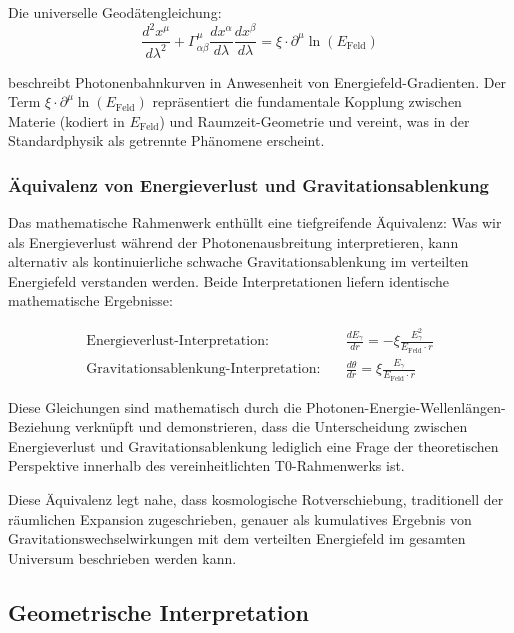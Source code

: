 \documentclass[12pt,a4paper]{article}
\newcommand{\efield}{E_{\text{Feld}}}
\theoremstyle{definition}
\begin{document}
	Die universelle Geod\"atengleichung:
	\begin{equation}
		\frac{d^2 x^\mu}{d\lambda^2} + \Gamma^\mu_{\alpha\beta}\frac{dx^\alpha}{d\lambda}\frac{dx^\beta}{d\lambda} = \xi \cdot \partial^\mu \ln(\efield)
	\end{equation}
	
	beschreibt Photonenbahnkurven in Anwesenheit von Energiefeld-Gradienten. Der Term $\xi \cdot \partial^\mu \ln(\efield)$ repr\"asentiert die fundamentale Kopplung zwischen Materie (kodiert in $\efield$) und Raumzeit-Geometrie und vereint, was in der Standardphysik als getrennte Ph\"anomene erscheint.
	
	\subsubsection{\"Aquivalenz von Energieverlust und Gravitationsablenkung}
	
	Das mathematische Rahmenwerk enth\"ullt eine tiefgreifende \"Aquivalenz: Was wir als Energieverlust w\"ahrend der Photonenausbreitung interpretieren, kann alternativ als kontinuierliche schwache Gravitationsablenkung im verteilten Energiefeld verstanden werden. Beide Interpretationen liefern identische mathematische Ergebnisse:
	
	\begin{align}
		\text{Energieverlust-Interpretation:} \quad &\frac{dE_\gamma}{dr} = -\xi \frac{E_\gamma^2}{\efield \cdot r} \\
		\text{Gravitationsablenkung-Interpretation:} \quad &\frac{d\theta}{dr} = \xi \frac{E_\gamma}{\efield \cdot r}
	\end{align}
	
	Diese Gleichungen sind mathematisch durch die Photonen-Energie-Wellenl\"angen-Beziehung verkn\"upft und demonstrieren, dass die Unterscheidung zwischen Energieverlust und Gravitationsablenkung lediglich eine Frage der theoretischen Perspektive innerhalb des vereinheitlichten T0-Rahmenwerks ist.
	
	Diese \"Aquivalenz legt nahe, dass kosmologische Rotverschiebung, traditionell der r\"aumlichen Expansion zugeschrieben, genauer als kumulatives Ergebnis von Gravitationswechselwirkungen mit dem verteilten Energiefeld im gesamten Universum beschrieben werden kann.
	
	\subsection{Geometrische Interpretation}
	
\end{document}
